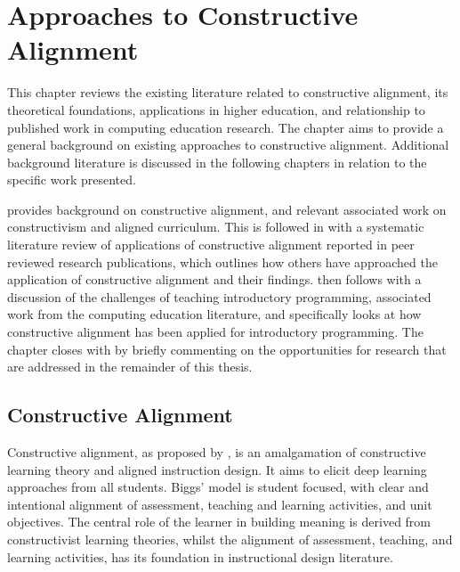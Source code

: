 
\chapter{Approaches to Constructive Alignment} %
\label{cha:background}

\graphicspath{{Figures/Background/}}

This chapter reviews the existing literature related to constructive alignment, its theoretical foundations, applications in higher education, and relationship to published work in computing education research. The chapter aims to provide a general background on existing approaches to constructive alignment. Additional background literature is discussed in the following chapters in relation to the specific work presented. 

 provides background on constructive alignment, and relevant associated work on constructivism and aligned curriculum. This is followed in  with a systematic literature review of applications of constructive alignment reported in peer reviewed research publications, which outlines how others have approached the application of constructive alignment and their findings.  then follows with a discussion of the challenges of teaching introductory programming, associated work from the computing education literature, and specifically looks at how constructive alignment has been applied for introductory programming. The chapter closes with  by briefly commenting on the opportunities for research that are addressed in the remainder of this thesis.


\section{Constructive Alignment} %
\label{sec:constructive_alignment}

Constructive alignment, as proposed by \citet{Biggs:1996c}, is an amalgamation of constructive learning theory and aligned instruction design. It aims to elicit deep learning approaches from all students. Biggs' model is student focused, with clear and intentional alignment of assessment, teaching and learning activities, and unit objectives. The central role of the learner in building meaning is derived from constructivist learning theories, whilst the alignment of assessment, teaching, and learning activities, has its foundation in instructional design literature. 

